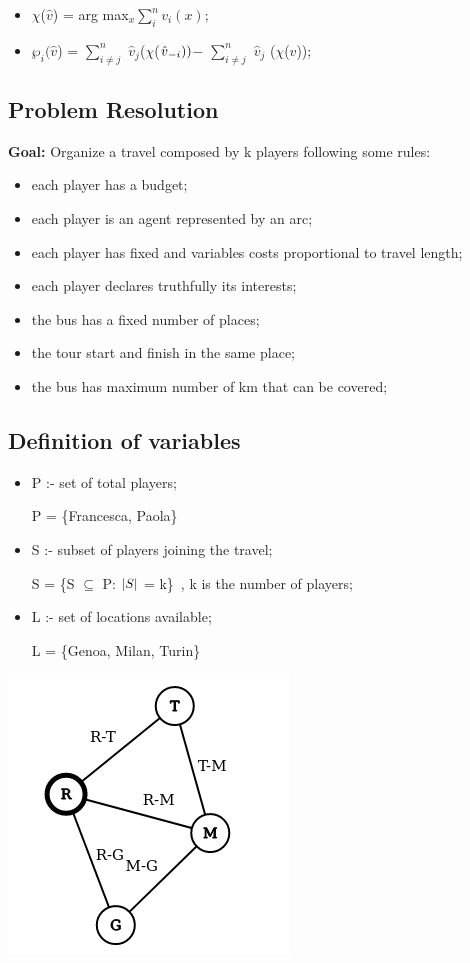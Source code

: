 \documentclass[12pt]{article}
\begin{document}
\begin{itemize}
\centering
\item $\chi$($\hat{v}$) = arg max$_x$$\sum_{i}^n v_i(x)$;
\item $\wp_i(\hat{v}$) = $\sum_{i\neq j}^n$ $\hat{v}$$_j$($\chi$($\hat{v}\textsubscript{$-i$}))$$-$
$\sum_{i\neq j}^n$ $\hat{v}$$_j$
($\chi$($\hat{v}$));
\end{itemize}
\newpage
\begin{flushleft}
\section{Problem Resolution}
\textbf{Goal:} Organize a travel composed by k players following some rules:
\end{flushleft}

\begin{itemize}
    \item each player has a budget;
    \item each player is an agent represented by an arc;
    \item each player has fixed and variables costs proportional to travel length;
    \item each player declares truthfully its interests;
    \item the bus has a fixed number of places;
    \item the tour start and finish in the same place;
    \item the bus has maximum number of km that can be covered;
\end{itemize}
\begin{flushleft}
\subsection{Definition of variables}
\end{flushleft}
\begin{itemize}
    \item P :- set of total players;
    \begin{center}
        P = \{Francesca, Paola\}\
    \end{center}
    \item S :- subset of players joining the travel;\
    \begin{center}
        S = \{S $\subseteq$ P: $\abs{S}$ = k\}\ , k is the number of players;

    \end{center}
     \item L :- set of locations available;\
    \begin{center}
        L = \{Genoa, Milan, Turin\}\ 

\end{center}
\end{itemize}
\includegraphics[width=0.4\columnwidth]{images/graph.png}
\end{document}
